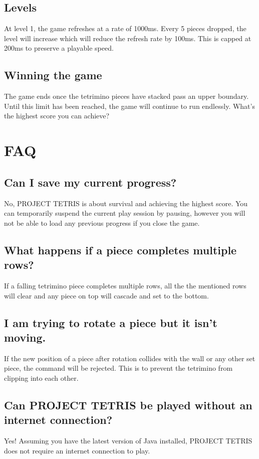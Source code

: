 \documentclass[12pt, titlepage]{article}
\begin{document}
\subsection{Levels}
At level 1, the game refreshes at a rate of 1000ms. Every 5 pieces dropped, the level will increase which will reduce the refresh rate by 100ms. This is capped at 200ms to preserve a playable speed.

\subsection{Winning the game}
The game ends once the tetrimino pieces have stacked pass an upper boundary. Until this limit has been reached, the game will continue to run endlessly.
What's the highest score you can achieve?

\section{FAQ}
\subsection{Can I save my current progress?}
No, PROJECT TETRIS is about survival and achieving the highest score. You can temporarily suspend the current play session by pausing, however you will not be able to load any previous progress if you close the game.

\subsection{What happens if a piece completes multiple rows?}
If a falling tetrimino piece completes multiple rows, all the the mentioned rows will clear and any piece on top will cascade and set to the bottom.

\subsection{I am trying to rotate a piece but it isn't moving.}
If the new position of a piece after rotation collides with the wall or any other set piece, the command will be rejected. This is to prevent the tetrimino from clipping into each other.

\subsection{Can PROJECT TETRIS be played without an internet connection?}
Yes! Assuming you have the latest version of Java installed, PROJECT TETRIS does not require an internet connection to play.
\end{document}
